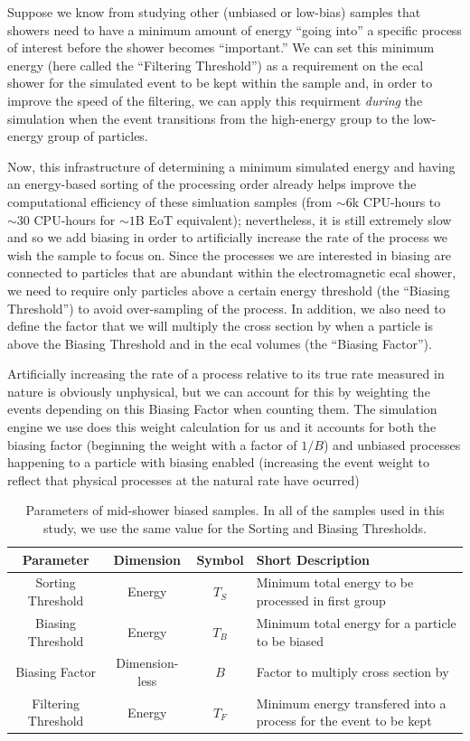 Suppose we know from studying other (unbiased or low-bias) samples that showers need to have
a minimum amount of energy ``going into'' a specific process of interest before the shower
becomes ``important.''
We can set this minimum energy (here called the ``Filtering Threshold'') as a requirement on
the \ac{ecal} shower for the simulated event to be kept within the sample and, in order to
improve the speed of the filtering, we can apply this requirment \emph{during} the simulation
when the event transitions from the high-energy group to the low-energy group of particles.


Now, this infrastructure of determining a minimum simulated energy and having an energy-based
sorting of the processing order already helps improve the computational efficiency of these 
simluation samples (from $\sim 6$k CPU-hours to $\sim 30$ CPU-hours for $\sim 1$B EoT equivalent); 
nevertheless, it is still extremely slow and so we add biasing in order to artificially increase 
the rate of the process we wish the sample to focus on.
Since the processes we are interested in biasing are connected to particles that are abundant
within the electromagnetic \ac{ecal} shower, we need to require only particles above a
certain energy threshold (the ``Biasing Threshold'') to avoid over-sampling of the process.
In addition, we also need to define the factor that we will multiply the cross section by
when a particle is above the Biasing Threshold and in the \ac{ecal} volumes (the ``Biasing Factor'').

Artificially increasing the rate of a process relative to its true rate measured in nature
is obviously unphysical, but we can account for this by weighting the events depending on this
Biasing Factor when counting them.
The simulation engine we use does this weight calculation for us and it accounts for both the
biasing factor (beginning the weight with a factor of $1/B$) and unbiased processes happening
to a particle with biasing enabled (increasing the event weight to reflect that physical processes
at the natural rate have ocurred)

\begin{table}[htb]
    \centering
    \begin{tabular}{c|cc|p{}}
        Parameter & Dimension & Symbol & Short Description \\ \hline \hline
        Sorting Threshold & Energy & $T_S$ & Minimum total energy to be processed in first group \\ \hline
        Biasing Threshold & Energy & $T_B$ & Minimum total energy for a particle to be biased \\ \hline
        Biasing Factor & Dimension-less & $B$ & Factor to multiply cross section by \\ \hline
        Filtering Threshold & Energy & $T_F$ & Minimum energy transfered into a process for the event to be kept \\
    \end{tabular}
    \caption{Parameters of mid-shower biased samples. In all of the samples used in this study, we use the same value for the Sorting and Biasing Thresholds.}
    \label{tab:biasing-parameters}
\end{table}

